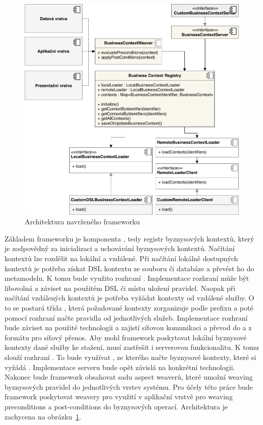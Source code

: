 \begin{figure}
    \centering
    \includegraphics[keepaspectratio=true, width=\linewidth]{figures/business-context-registry.pdf}
    \caption{Architektura navrženého frameworku}
    \label{fig:business-context-registry}
\end{figure}

Základem frameworku je komponenta , tedy registr
byznysových kontextů, který je zodpovědný za inicializaci a uchovávání byznysových kontextů.
Načítání kontextů lze rozdělit na lokální a vzdálené. Při načítání lokálně dostupných kontextů
je potřeba získat \gls{DSL} kontextu ze souboru či databáze a převést ho do metamodelu.
K tomu bude využito rozhraní . Implementace rozhraní může být libovolná
a záviset na použitém \gls{DSL} či místu uložení pravidel. Naopak při načítání vzdálených
kontextů je potřeba vyžádat kontexty od vzdálené služby. O to se postará třída ,
která požadované kontexty zorganizuje podle prefixu a poté pomocí rozhraní  načte
pravidla od jednotlivých služeb. Implementace rozhraní  bude záviset na použité
technologii a zajistí síťovou komunikaci a převod do a z formátu pro síťový přenos.
Aby mohl framework poskytovat lokální byznysové kontexty dané služby ke stažení, musí zastřešit
i serverovou funkcionalitu. K tomu slouží rozhraní . To bude využívat
, ze kterého načte byznysové kontexty, které si vyžádá .
Implementace serveru bude opět závislá na konkrétní technologii.
Nakonec bude framework obsahovat sadu aspect weaverů, které umožní weaving byznysových pravidel do
jednotlivých vrstev systému. Pro účely této práce bude framework poskytovat weavery pro využití v
aplikační vrstvě pro weaving preconditions a post-conditions do byznysových operací.
Architektura je zachycena na obrázku~\ref{fig:business-context-registry}.

